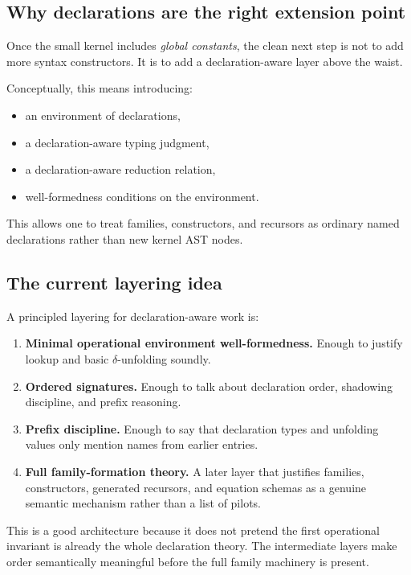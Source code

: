 \documentclass[11pt]{article}
\newcommand{\deltared}{\ensuremath{\delta}}
\begin{document}
\subsection{Why declarations are the right extension point}

Once the small kernel includes \emph{global constants}, the clean next step is
not to add more syntax constructors. It is to add a declaration-aware layer
above the waist.

Conceptually, this means introducing:
\begin{itemize}[leftmargin=2em]
  \item an environment of declarations,
  \item a declaration-aware typing judgment,
  \item a declaration-aware reduction relation,
  \item well-formedness conditions on the environment.
\end{itemize}

This allows one to treat families, constructors, and recursors as ordinary named
declarations rather than new kernel AST nodes.

\subsection{The current layering idea}

A principled layering for declaration-aware work is:
\begin{enumerate}[leftmargin=2em]
  \item \textbf{Minimal operational environment well-formedness.}
  Enough to justify lookup and basic $\deltared$-unfolding soundly.
  \item \textbf{Ordered signatures.}
  Enough to talk about declaration order, shadowing discipline, and prefix
  reasoning.
  \item \textbf{Prefix discipline.}
  Enough to say that declaration types and unfolding values only mention names
  from earlier entries.
  \item \textbf{Full family-formation theory.}
  A later layer that justifies families, constructors, generated recursors, and
  equation schemas as a genuine semantic mechanism rather than a list of pilots.
\end{enumerate}

This is a good architecture because it does not pretend the first operational
invariant is already the whole declaration theory. The intermediate layers make
order semantically meaningful before the full family machinery is present.
\end{document}
